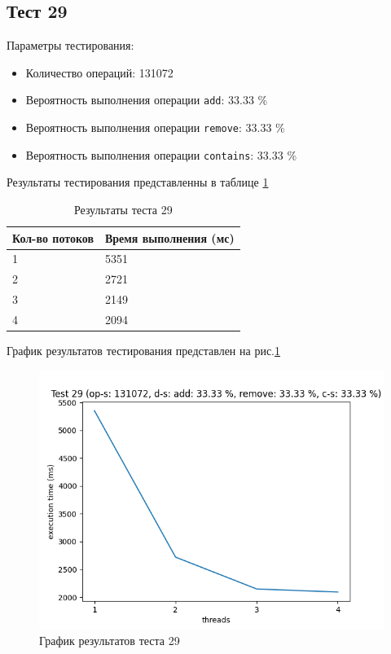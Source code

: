 \subsection*{Тест 29}

Параметры тестирования:

\begin{itemize}
    \item Количество операций: 131072
    \item Вероятность выполнения операции \verb|add|: 33.33 \%
    \item Вероятность выполнения операции \verb|remove|: 33.33 \%
    \item Вероятность выполнения операции \verb|contains|: 33.33 \%
\end{itemize}

Результаты тестирования представленны в таблице \ref{tab:results29}


\begin{table}[H]
    \centering
    \begin{tabular}{|l|l|}
        \hline
        Кол-во потоков & Время выполнения (мс) \\
        \hline
        1 & 5351 \\
        \hline
        2 & 2721 \\
        \hline
        3 & 2149 \\
        \hline
        4 & 2094 \\
        \hline
    \end{tabular}
    \caption{Результаты теста 29}
    \label{tab:results29}
\end{table}
        

График результатов тестирования представлен на рис.\ref{fig:plot29}

\begin{figure}[H]
    \centering
    \includegraphics[width=0.7\linewidth]{photo/plot29}
    \caption{График результатов теста 29}
    \label{fig:plot29}
\end{figure}

